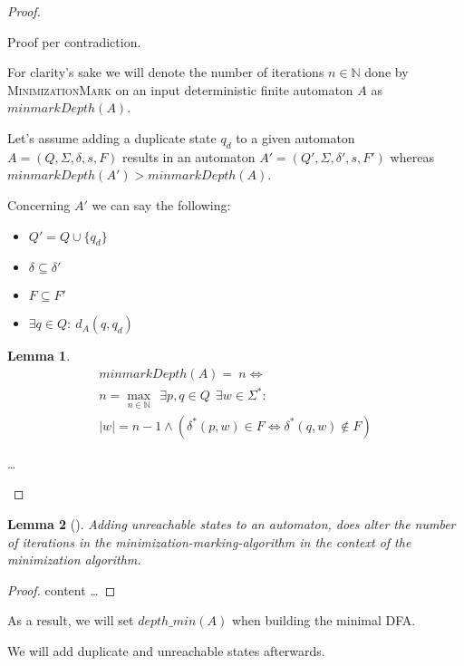 \documentclass[a4paper, oneside, 11pt]{report}
\newtheorem{lemma}{Lemma}
\theoremstyle{definition}
\theoremstyle{remark}
\begin{document}
\begin{proof}
	\begin{description}
		\item
		
		Proof per contradiction.
		
		For clarity's sake we will denote the number of iterations $n \in \mathbb{N}$ done by \textsc{MinimizationMark} on an input deterministic finite automaton $A$ as $minmarkDepth(A)$.
		
		Let's assume adding a duplicate state $q_d$ to a given automaton $A = (Q, \Sigma, \delta, s, F)$ results in an automaton $A' = (Q', \Sigma, \delta', s, F')$ whereas $minmarkDepth(A') > minmarkDepth(A)$.
		
		Concerning $A'$ we can say the following:
		\begin{itemize}
			\item $Q' = Q \cup \{ q_d \}$
			\item $\delta \subseteq \delta'$
			\item $F \subseteq F'$
			\item $\exists q \in Q \colon\ d_A(q, q_d)$
		\end{itemize}
		
		\begin{lemma}
			\begin{multline*}
				minmarkDepth(A) =\ n \Leftrightarrow \\
				n = \max_{n \in \mathbb{N}}\ \ \exists p, q \in Q\ \ \exists w \in \Sigma^* \colon \\
				|w| = n - 1 \land (\delta^*(p,w) \in F \Leftrightarrow \delta^*(q,w) \notin F)
			\end{multline*}
		\end{lemma}
	
		\ldots
	\end{description}
\end{proof}

\begin{lemma}[]
	Adding unreachable states to an automaton, does alter the number of iterations in the minimization-marking-algorithm in the context of the minimization algorithm.
\end{lemma}

\begin{proof}
	content \ldots
\end{proof}

As a result, we will set $depth\_min(A)$ when building the minimal DFA.

We will add duplicate and unreachable states afterwards.
\end{document}
